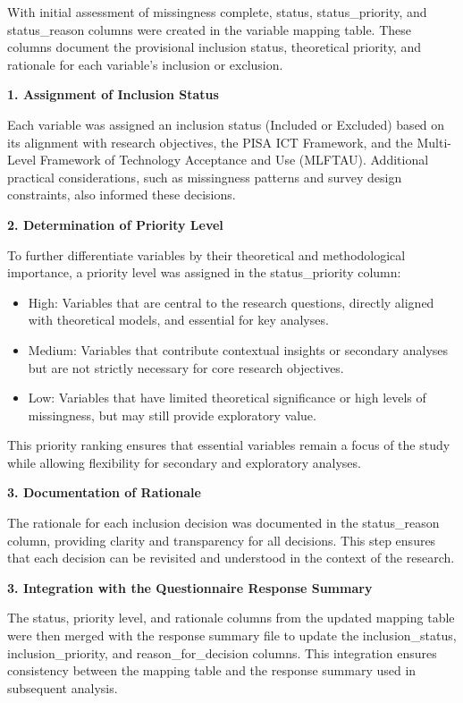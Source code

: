 \documentclass[
]{article}
\begin{document}
With initial assessment of missingness complete, status,
status\_priority, and status\_reason columns were created in the
variable mapping table. These columns document the provisional inclusion
status, theoretical priority, and rationale for each variable's
inclusion or exclusion.

\textbf{1. Assignment of Inclusion Status}

Each variable was assigned an inclusion status (Included or Excluded)
based on its alignment with research objectives, the PISA ICT Framework,
and the Multi-Level Framework of Technology Acceptance and Use (MLFTAU).
Additional practical considerations, such as missingness patterns and
survey design constraints, also informed these decisions.

\textbf{2. Determination of Priority Level}

To further differentiate variables by their theoretical and
methodological importance, a priority level was assigned in the
status\_priority column:

\begin{itemize}
\item
  High: Variables that are central to the research questions, directly
  aligned with theoretical models, and essential for key analyses.
\item
  Medium: Variables that contribute contextual insights or secondary
  analyses but are not strictly necessary for core research objectives.
\item
  Low: Variables that have limited theoretical significance or high
  levels of missingness, but may still provide exploratory value.
\end{itemize}

This priority ranking ensures that essential variables remain a focus of
the study while allowing flexibility for secondary and exploratory
analyses.

\textbf{3. Documentation of Rationale}

The rationale for each inclusion decision was documented in the
status\_reason column, providing clarity and transparency for all
decisions. This step ensures that each decision can be revisited and
understood in the context of the research.

\textbf{3. Integration with the Questionnaire Response Summary}

The status, priority level, and rationale columns from the updated
mapping table were then merged with the response summary file to update
the inclusion\_status, inclusion\_priority, and reason\_for\_decision
columns. This integration ensures consistency between the mapping table
and the response summary used in subsequent analysis.
\end{document}
